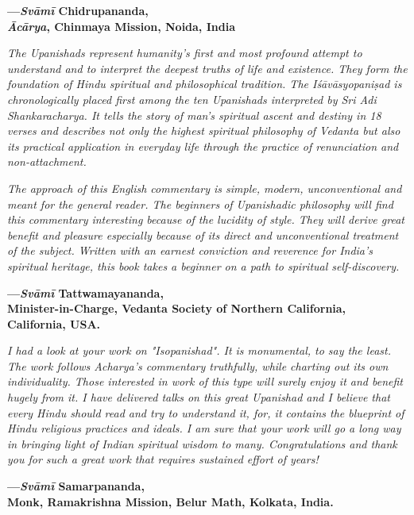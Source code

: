 \begin{flushright}
\textbf{---\emph{Svāmī} Chidrupananda,}\\
\textbf{\emph{Ācārya}, Chinmaya Mission, Noida, India}
\end{flushright}
\medskip

\emph{The Upanishads represent humanity's first and most profound attempt to understand and to interpret the deepest truths of life and existence. They form the foundation of Hindu spiritual and philosophical tradition. The Iśāvāsyopaniṣad is chronologically placed first among the ten Upanishads interpreted by Sri Adi Shankaracharya. It tells the story of man's spiritual ascent and destiny in 18 verses and describes not only the highest spiritual philosophy of Vedanta but also its practical application in everyday life through the practice of renunciation and non-attachment.}

\emph{The approach of this English commentary is simple, modern, unconventional and meant for the general reader. The beginners of Upanishadic philosophy will find this commentary interesting because of the lucidity of style. They will derive great benefit and pleasure especially because of its direct and unconventional treatment of the subject. Written with an earnest conviction and reverence for India's spiritual heritage, this book takes a beginner on a path to spiritual self-discovery.}
\medskip

\begin{flushright}
\textbf{---\emph{Svāmī} Tattwamayananda,}\\
\textbf{Minister-in-Charge, Vedanta Society of Northern California, California, USA.}
\end{flushright}
\medskip

\emph{I had a look at your work on "Isopanishad". It is monumental, to say the least. The work follows Acharya's commentary truthfully, while charting out its own individuality. Those interested in work of this type will surely enjoy it and benefit hugely from it. I have delivered talks on this great Upanishad and I believe that every Hindu should read and try to understand it, for, it contains the blueprint of Hindu religious practices and ideals. I am sure that your work will go a long way in bringing light of Indian spiritual wisdom to many. Congratulations and thank you for such a great work that requires sustained effort of years!}
\medskip

\begin{flushright}
\textbf{---\emph{Svāmī} Samarpananda,}\\
\textbf{Monk, Ramakrishna Mission, Belur Math, Kolkata, India.}
\end{flushright}
\medskip

